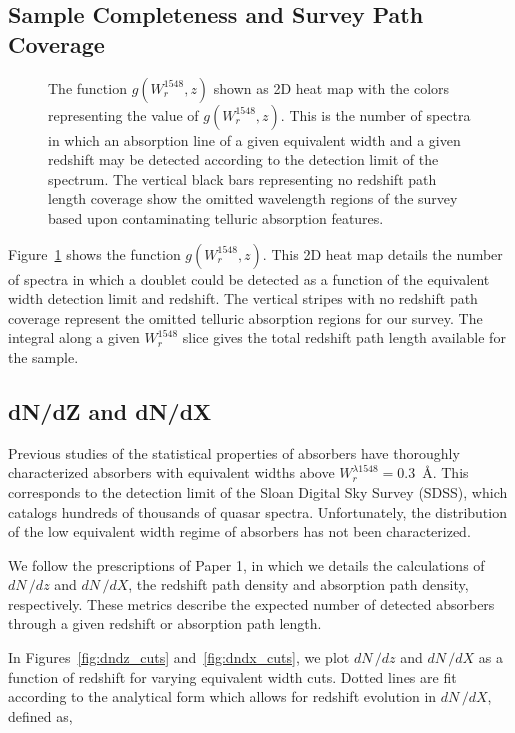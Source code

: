 \documentclass[linenumbers,twocolumn]{aastex61}
\begin{document}
\subsection{Sample Completeness and Survey Path Coverage}

\begin{figure}[bth]
\caption{The function $g(W_r^{1548}, z)$ shown as 2D heat map with the colors representing the value of $g(W_r^{1548}, z)$. This is the number of spectra in which an absorption line of a given equivalent width and a given redshift may be detected according to the detection limit of the spectrum. The vertical black bars representing no redshift path length coverage show the omitted wavelength regions of the survey based upon contaminating telluric absorption features.}
\label{fig:gwz}
\end{figure}

Figure~\ref{fig:gwz} shows the function $g(W_r^{1548}, z)$. This 2D heat map details the number of spectra in which a {\CIVdblt} doublet could be detected as a function of the equivalent width detection limit and redshift. The vertical stripes with no redshift path coverage represent the omitted telluric absorption regions for our survey. The integral along a given $W_r^{1548}$ slice gives the total redshift path length available for the sample.

\subsection{dN/dZ and dN/dX}
\label{dndzdndx}

Previous studies of the statistical properties of {\CIV} absorbers have thoroughly characterized {\CIV} absorbers with equivalent widths above $W_r^{\lambda1548} = 0.3$~{\AA}. This corresponds to the detection limit of the Sloan Digital Sky Survey (SDSS), which catalogs hundreds of thousands of quasar spectra. Unfortunately, the distribution of the low equivalent width regime of {\CIV} absorbers has not been characterized.

We follow the prescriptions of Paper 1, in which we details the calculations of $dN\,/dz$ and $dN\,/dX$, the redshift path density and absorption path density, respectively. These metrics describe the expected number of detected absorbers through a given redshift or absorption path length.

In Figures~\ref{fig:dndz_cuts} and~\ref{fig:dndx_cuts}, we plot $dN\,/dz$ and $dN\,/dX$ as a function of redshift for varying equivalent width cuts. Dotted lines are fit according to the analytical form which allows for redshift evolution in $dN\,/dX$, defined as,
\end{document}

